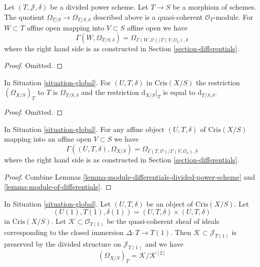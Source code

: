 \begin{lemma}
\label{lemma-module-differentials-divided-power-scheme}
Let $(T, \mathcal{J}, \delta)$ be a divided power scheme.
Let $T \to S$ be a morphism of schemes.
The quotient $\Omega_{T/S} \to \Omega_{T/S, \delta}$
described above is a quasi-coherent $\mathcal{O}_T$-module.
For $W \subset T$ affine open mapping into $V \subset S$ affine open
we have
$$
\Gamma(W, \Omega_{T/S, \delta}) =
\Omega_{\Gamma(W, \mathcal{O})/\Gamma(V, \mathcal{O}_V), \delta}
$$
where the right hand side is
as constructed in Section \ref{section-differentials}.
\end{lemma}

\begin{proof}
Omitted.
\end{proof}

\begin{lemma}
\label{lemma-module-of-differentials}
In Situation \ref{situation-global}.
For $(U, T, \delta)$ in $\text{Cris}(X/S)$ the restriction
$(\Omega_{X/S})_T$ to $T$ is $\Omega_{T/S, \delta}$ and the restriction
$\text{d}_{X/S}|_T$ is equal to $\text{d}_{T/S, \delta}$.
\end{lemma}

\begin{proof}
Omitted.
\end{proof}

\begin{lemma}
\label{lemma-module-of-differentials-on-affine}
In Situation \ref{situation-global}.
For any affine object $(U, T, \delta)$ of $\text{Cris}(X/S)$
mapping into an affine open $V \subset S$ we have
$$
\Gamma((U, T, \delta), \Omega_{X/S}) =
\Omega_{\Gamma(T, \mathcal{O})/\Gamma(V, \mathcal{O}_V), \delta}
$$
where the right hand side is
as constructed in Section \ref{section-differentials}.
\end{lemma}

\begin{proof}
Combine Lemmas \ref{lemma-module-differentials-divided-power-scheme} and
\ref{lemma-module-of-differentials}.
\end{proof}

\begin{lemma}
\label{lemma-describe-omega-small}
In Situation \ref{situation-global}.
Let $(U, T, \delta)$ be an object of $\text{Cris}(X/S)$.
Let
$$
(U(1), T(1), \delta(1)) = (U, T, \delta) \times (U, T, \delta)
$$
in $\text{Cris}(X/S)$. Let $\mathcal{K} \subset \mathcal{O}_{T(1)}$
be the quasi-coherent sheaf of ideals corresponding to the closed
immersion $\Delta : T \to T(1)$. Then
$\mathcal{K} \subset \mathcal{J}_{T(1)}$ is preserved by the
divided structure on $\mathcal{J}_{T(1)}$ and we have
$$
(\Omega_{X/S})_T = \mathcal{K}/\mathcal{K}^{[2]}
$$
\end{lemma}

